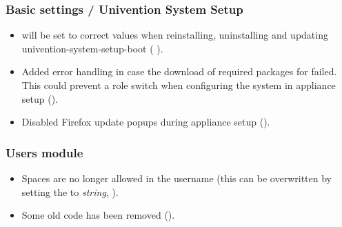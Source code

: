 \subsubsection{Basic settings / Univention System Setup}
\begin{itemize}
\item {} will be set to correct values when reinstalling, 
uninstalling and updating univention-system-setup-boot ( ).
\item Added error handling in case the download of required packages for
 failed. This could prevent a
role switch when configuring the system in appliance setup ().
\item Disabled Firefox update popups during appliance setup ().
\end{itemize}

\subsubsection{Users module}
\begin{itemize}
\item Spaces are no longer allowed in the username (this can be overwritten by setting the
 to \emph{string}, ).
\item Some old code has been removed ().
\end{itemize}




